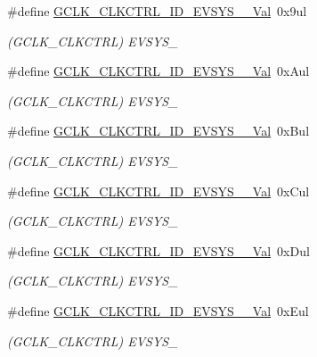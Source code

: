 \begin{DoxyCompactItemize}
\#define \mbox{\hyperlink{group___s_a_m_d21___g_c_l_k_ga2a41efb893147142a523da4ffd9b6e4e}{G\+C\+L\+K\+\_\+\+C\+L\+K\+C\+T\+R\+L\+\_\+\+I\+D\+\_\+\+E\+V\+S\+Y\+S\+\_\+\_\+\+Val}}~0x9ul
\begin{DoxyCompactList}\small\item\em (G\+C\+L\+K\+\_\+\+C\+L\+K\+C\+T\+RL) E\+V\+S\+Y\+S\+\_ \end{DoxyCompactList}\item 
\#define \mbox{\hyperlink{group___s_a_m_d21___g_c_l_k_gaf3e4dae1c92305f72ab76d6574385b69}{G\+C\+L\+K\+\_\+\+C\+L\+K\+C\+T\+R\+L\+\_\+\+I\+D\+\_\+\+E\+V\+S\+Y\+S\+\_\+\_\+\+Val}}~0x\+Aul
\begin{DoxyCompactList}\small\item\em (G\+C\+L\+K\+\_\+\+C\+L\+K\+C\+T\+RL) E\+V\+S\+Y\+S\+\_ \end{DoxyCompactList}\item 
\#define \mbox{\hyperlink{group___s_a_m_d21___g_c_l_k_ga25bf241f7a00a504aeff5f694369c419}{G\+C\+L\+K\+\_\+\+C\+L\+K\+C\+T\+R\+L\+\_\+\+I\+D\+\_\+\+E\+V\+S\+Y\+S\+\_\+\_\+\+Val}}~0x\+Bul
\begin{DoxyCompactList}\small\item\em (G\+C\+L\+K\+\_\+\+C\+L\+K\+C\+T\+RL) E\+V\+S\+Y\+S\+\_ \end{DoxyCompactList}\item 
\#define \mbox{\hyperlink{group___s_a_m_d21___g_c_l_k_ga40c7990c5913976e60b394ef65aa506e}{G\+C\+L\+K\+\_\+\+C\+L\+K\+C\+T\+R\+L\+\_\+\+I\+D\+\_\+\+E\+V\+S\+Y\+S\+\_\+\_\+\+Val}}~0x\+Cul
\begin{DoxyCompactList}\small\item\em (G\+C\+L\+K\+\_\+\+C\+L\+K\+C\+T\+RL) E\+V\+S\+Y\+S\+\_ \end{DoxyCompactList}\item 
\#define \mbox{\hyperlink{group___s_a_m_d21___g_c_l_k_ga5c81fa460cfafd2cc80c0b65a7159b02}{G\+C\+L\+K\+\_\+\+C\+L\+K\+C\+T\+R\+L\+\_\+\+I\+D\+\_\+\+E\+V\+S\+Y\+S\+\_\+\_\+\+Val}}~0x\+Dul
\begin{DoxyCompactList}\small\item\em (G\+C\+L\+K\+\_\+\+C\+L\+K\+C\+T\+RL) E\+V\+S\+Y\+S\+\_ \end{DoxyCompactList}\item 
\#define \mbox{\hyperlink{group___s_a_m_d21___g_c_l_k_ga5473e48e8fafbc87545b3363feda6e0b}{G\+C\+L\+K\+\_\+\+C\+L\+K\+C\+T\+R\+L\+\_\+\+I\+D\+\_\+\+E\+V\+S\+Y\+S\+\_\+\_\+\+Val}}~0x\+Eul
\begin{DoxyCompactList}\small\item\em (G\+C\+L\+K\+\_\+\+C\+L\+K\+C\+T\+RL) E\+V\+S\+Y\+S\+\_ \end{DoxyCompactList}\item 

\end{DoxyCompactItemize}
